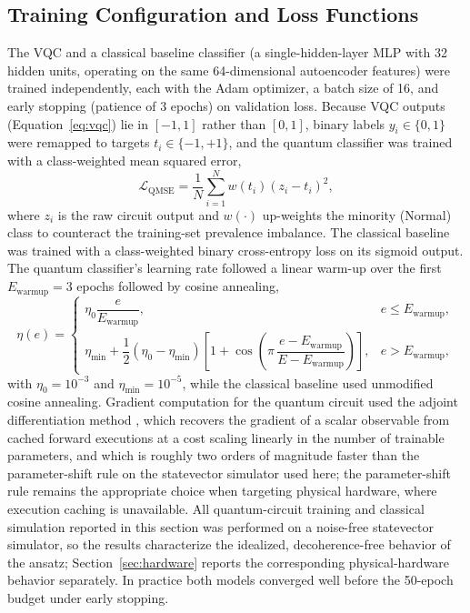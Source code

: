 \documentclass[11pt,a4paper]{article}
\begin{document}
\subsection{Training Configuration and Loss Functions}

The VQC and a classical baseline classifier (a single-hidden-layer MLP with
32 hidden units, operating on the same 64-dimensional autoencoder features)
were trained independently, each with the Adam optimizer, a batch size of 16,
and early stopping (patience of 3 epochs) on validation loss.  Because VQC
outputs (Equation~\ref{eq:vqc}) lie in $[-1,1]$ rather
than $[0,1]$, binary labels $y_i \in \{0,1\}$ were remapped to targets
$t_i \in \{-1,+1\}$, and the quantum classifier was trained with a
class-weighted mean squared error,
\begin{equation}
  \mathcal{L}_{\text{QMSE}} = \frac{1}{N}\sum_{i=1}^{N}
  w(t_i)\left(z_i - t_i\right)^2,
  \label{eq:qmse}
\end{equation}
where $z_i$ is the raw circuit output and $w(\cdot)$ up-weights the minority
(Normal) class to counteract the training-set prevalence imbalance.  The
classical baseline was trained with a class-weighted binary cross-entropy loss
on its sigmoid output.  The quantum classifier's learning rate followed a
linear warm-up over the first $E_{\text{warmup}} = 3$ epochs followed by
cosine annealing,
\begin{equation}
  \eta(e) =
  \begin{cases}
    \eta_0 \dfrac{e}{E_{\text{warmup}}}, & e \le E_{\text{warmup}}, \\[8pt]
    \eta_{\min} + \dfrac{1}{2}(\eta_0 - \eta_{\min})\!\left[1 +
    \cos\!\left(\pi\, \dfrac{e - E_{\text{warmup}}}{E - E_{\text{warmup}}}
    \right)\right], & e > E_{\text{warmup}},
  \end{cases}
  \label{eq:cosine_schedule}
\end{equation}
with $\eta_0 = 10^{-3}$ and $\eta_{\min} = 10^{-5}$, while the classical
baseline used unmodified cosine annealing.  Gradient computation for the
quantum circuit used the adjoint differentiation method
\cite{mitarai2018}, which recovers the gradient of a scalar observable from
cached forward executions at a cost scaling linearly in the number of
trainable parameters, and which is roughly two orders of magnitude faster than
the parameter-shift rule on the statevector simulator used here; the
parameter-shift rule remains the appropriate choice when targeting physical
hardware, where execution caching is unavailable.  All quantum-circuit
training and classical simulation reported in this section was performed on a
noise-free statevector simulator, so the results characterize the idealized,
decoherence-free behavior of the ansatz; Section~\ref{sec:hardware} reports the
corresponding physical-hardware behavior separately.  In practice both models
converged well before the 50-epoch budget under early stopping.
\end{document}
